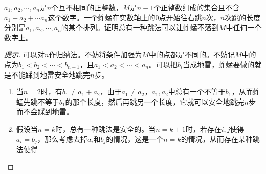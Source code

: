 \begin{example}[IMO 2009]
  $a_1,a_2,\cdots,a_n$是$n$个互不相同的正整数，$M$是$n-1$个正整数组成的集合且不含$a_1+a_2+\cdots a_n$这个数字。一个蚱蜢在实数轴上的0点开始往右跳$n$次，$n$次跳的长度分别是$a_1,a_2,\cdots,a_n$的某个排列。证明总有一种跳法可以让蚱蜢不落到$M$中任何一个数字上。
\end{example}
\begin{proof}[提示]
  可以对$n$作归纳法。不妨将条件加强为$M$中的点都是不同的。不妨记$M$中的点为$b_1<b_2<\cdots<b_{n-1}$，且$a_1<a_2<\cdots<a_n$。可以把$b_i$当成地雷，蚱蜢要做的就是不能踩到地雷安全地跳完$n$步。

  \begin{enumerate}
  \item 当$n=2$时，有$b_1\ne a_1 + a_2$，由于$a_1\ne a_2$，$a_1,a_2$中总有一个不等于$b_1$，从而蚱蜢先跳不等于$b_1$的那个长度，然后再跳另一个长度，它就可以安全地跳完$n$步而不会踩到地雷。
  \item 假设当$n=k$时，总有一种跳法是安全的。当$n=k+1$时，若存在$i,j$使得$a_i= b_j$，那么考虑去掉$a_i$和$b_j$的情况，这是一个$n=k$的情况，从而存在某种跳法使得
  \end{enumerate}
\end{proof}

\begin{example}[IMO 2017 P3]
  
\end{example}